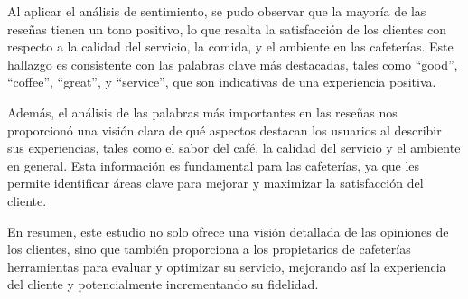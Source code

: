 \documentclass[journal]{IEEEtran}
\begin{document}
Al aplicar el análisis de sentimiento, se pudo observar que la mayoría de las reseñas tienen un tono positivo, lo que resalta la satisfacción de los clientes con respecto a la calidad del servicio, la comida, y el ambiente en las cafeterías. Este hallazgo es consistente con las palabras clave más destacadas, tales como “good”, “coffee”, “great”, y “service”, que son indicativas de una experiencia positiva.

Además, el análisis de las palabras más importantes en las reseñas nos proporcionó una visión clara de qué aspectos destacan los usuarios al describir sus experiencias, tales como el sabor del café, la calidad del servicio y el ambiente en general. Esta información es fundamental para las cafeterías, ya que les permite identificar áreas clave para mejorar y maximizar la satisfacción del cliente.

En resumen, este estudio no solo ofrece una visión detallada de las opiniones de los clientes, sino que también proporciona a los propietarios de cafeterías herramientas para evaluar y optimizar su servicio, mejorando así la experiencia del cliente y potencialmente incrementando su fidelidad.
\ifCLASSOPTIONcaptionsoff
  \newpage
\fi





%
%
%

\end{document}
